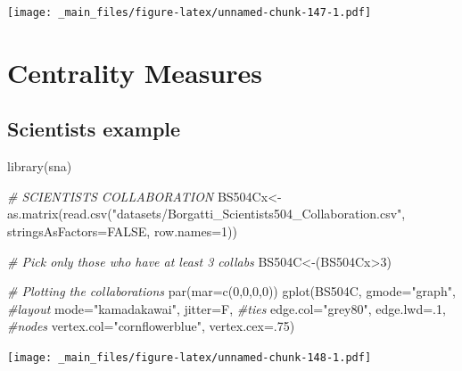 \documentclass[
  notitlepage,
  onecolumn,
  openany]{book}
\newenvironment{Shaded}{\begin{snugshade}}{\end{snugshade}}
\newcommand{\AttributeTok}[1]{\textcolor[rgb]{0.77,0.63,0.00}{#1}}
\newcommand{\CommentTok}[1]{\textcolor[rgb]{0.56,0.35,0.01}{\textit{#1}}}
\newcommand{\ConstantTok}[1]{\textcolor[rgb]{0.00,0.00,0.00}{#1}}
\newcommand{\DecValTok}[1]{\textcolor[rgb]{0.00,0.00,0.81}{#1}}
\newcommand{\FunctionTok}[1]{\textcolor[rgb]{0.00,0.00,0.00}{#1}}
\newcommand{\NormalTok}[1]{#1}
\newcommand{\OtherTok}[1]{\textcolor[rgb]{0.56,0.35,0.01}{#1}}
\newcommand{\SpecialCharTok}[1]{\textcolor[rgb]{0.00,0.00,0.00}{#1}}
\newcommand{\StringTok}[1]{\textcolor[rgb]{0.31,0.60,0.02}{#1}}
\begin{document}
\texttt{[image: \_main\_files/figure-latex/unnamed-chunk-147-1.pdf]}

\hypertarget{centrality-measures}{%
\chapter{Centrality Measures}\label{centrality-measures}}

\hypertarget{scientists-example}{%
\section{Scientists example}\label{scientists-example}}

\begin{Shaded}
\begin{Highlighting}[]
\FunctionTok{library}\NormalTok{(sna)}

\CommentTok{\# SCIENTISTS COLLABORATION}
\NormalTok{BS504Cx}\OtherTok{\textless{}{-}}\FunctionTok{as.matrix}\NormalTok{(}\FunctionTok{read.csv}\NormalTok{(}\StringTok{"datasets/Borgatti\_Scientists504\_Collaboration.csv"}\NormalTok{,}
                            \AttributeTok{stringsAsFactors=}\ConstantTok{FALSE}\NormalTok{, }\AttributeTok{row.names=}\DecValTok{1}\NormalTok{))}

\CommentTok{\# Pick only those who have at least 3 collabs}
\NormalTok{BS504C}\OtherTok{\textless{}{-}}\NormalTok{(BS504Cx}\SpecialCharTok{\textgreater{}}\DecValTok{3}\NormalTok{)}

\CommentTok{\# Plotting the collaborations}
\FunctionTok{par}\NormalTok{(}\AttributeTok{mar=}\FunctionTok{c}\NormalTok{(}\DecValTok{0}\NormalTok{,}\DecValTok{0}\NormalTok{,}\DecValTok{0}\NormalTok{,}\DecValTok{0}\NormalTok{))}
\FunctionTok{gplot}\NormalTok{(BS504C, }
      \AttributeTok{gmode=}\StringTok{"graph"}\NormalTok{,}
      \CommentTok{\#layout}
      \AttributeTok{mode=}\StringTok{"kamadakawai"}\NormalTok{,}
      \AttributeTok{jitter=}\NormalTok{F,}
      \CommentTok{\#ties}
      \AttributeTok{edge.col=}\StringTok{"grey80"}\NormalTok{, }
      \AttributeTok{edge.lwd=}\NormalTok{.}\DecValTok{1}\NormalTok{,}
      \CommentTok{\#nodes}
      \AttributeTok{vertex.col=}\StringTok{"cornflowerblue"}\NormalTok{,}
      \AttributeTok{vertex.cex=}\NormalTok{.}\DecValTok{75}\NormalTok{)}
\end{Highlighting}
\end{Shaded}

\texttt{[image: \_main\_files/figure-latex/unnamed-chunk-148-1.pdf]}
\end{document}
